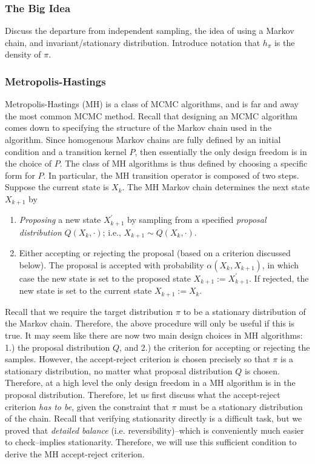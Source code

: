\documentclass[12pt]{article}
\begin{document}
\subsubsection{The Big Idea}
Discuss the departure from independent sampling, the idea of using a Markov chain, and invariant/stationary distribution. Introduce notation that $h_\pi$ is the density of $\pi$. 

\subsubsection{Metropolis-Hastings}
Metropolis-Hastings (MH) is a class of MCMC algorithms, and is far and away the most common MCMC method. Recall that designing an MCMC algorithm comes down to 
specifying the structure of the Markov chain used in the algorithm. Since homogenous Markov chains are fully defined by an initial condition and a transition kernel $P$, then 
essentially the only design freedom is in the choice of $P$. The class of MH algorithms is thus defined by choosing a specific form for $P$. In particular, the MH transition operator
is composed of two steps. Suppose the current state is $X_k$. The MH Markov chain determines the next state $X_{k + 1}$ by 
\begin{enumerate}
\item \textit{Proposing} a new state $X_{k + 1}^\prime$ by sampling from a specified \textit{proposal distribution} $Q(X_k, \cdot)$; i.e.,  $X_{k + 1} \sim Q(X_k, \cdot)$. 
\item Either accepting or rejecting the proposal (based on a criterion discussed below). The proposal is accepted with probability $\alpha(X_k, X_{k + 1})$, in which case the 
new state is set to the proposed state $X_{k + 1} := X_{k+1}^\prime$. If rejected, the new state is set to the current state $X_{k + 1} := X_k$. 
\end{enumerate}
Recall that we require the target distribution $\pi$ to be a stationary distribution of the Markov chain. Therefore, the above procedure will only be useful if this is true. It may seem like there 
are now two main design choices in MH algorithms: 1.) the proposal distribution $Q$, and 2.) the criterion for accepting or rejecting the samples. However, the accept-reject criterion is chosen 
precisely so that $\pi$ is a stationary distribution, no matter what proposal distribution $Q$ is chosen. Therefore, at a high level the only design freedom in a MH algorithm is in the proposal distribution. 
Therefore, let us first discuss what the accept-reject criterion \textit{has to be}, given the constraint that $\pi$ must be a stationary distribution of the chain. Recall that verifying stationarity directly is 
a difficult task, but we proved that \textit{detailed balance} (i.e. reversibility)--which is conveniently much easier to check--implies stationarity. Therefore, we will use this sufficient condition to derive the 
MH accept-reject criterion.  
\end{document}
